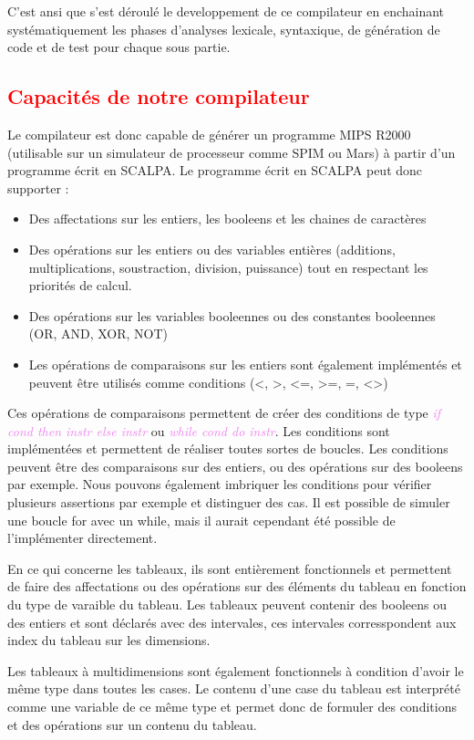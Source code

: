 \documentclass[a4paper]{article}
\let\oldtextit\textit
\renewcommand{\textit}[1]{\textcolor{violet}{\oldtextit{#1}}}
\newcommand{\csection}[1]{\textcolor{red}{\section{#1}}}
\begin{document}
C'est ansi que s'est déroulé le developpement de ce compilateur en enchainant systématiquement les phases d'analyses lexicale, syntaxique, de génération de code et de test pour chaque sous partie.

\csection{Capacités de notre compilateur}

Le compilateur est donc capable de générer un programme MIPS R2000 (utilisable sur un simulateur de processeur comme SPIM ou Mars) à partir d'un programme écrit en SCALPA.
Le programme écrit en SCALPA peut donc supporter :
\begin{itemize}
    \item Des affectations sur les entiers, les booleens et les chaines de caractères
    \item Des opérations sur les entiers ou des variables entières (additions, multiplications, soustraction, division, puissance) tout en respectant les priorités de calcul.
    \item Des opérations sur les variables booleennes ou des constantes booleennes (OR, AND, XOR, NOT)
    \item Les opérations de comparaisons sur les entiers sont également implémentés et peuvent être utilisés comme conditions (<, >, <=, >=, =, <>)
\end{itemize}

Ces opérations de comparaisons permettent de créer des conditions de type \textit{if cond then instr else instr } ou \textit{while cond do instr}. Les conditions sont implémentées et permettent de réaliser toutes sortes de boucles. Les conditions peuvent être des comparaisons sur des entiers, ou des opérations sur des booleens par exemple.
Nous pouvons également imbriquer les conditions pour vérifier plusieurs assertions par exemple et distinguer des cas.
Il est possible de simuler une boucle for avec un while, mais il aurait cependant été possible de l'implémenter directement.

En ce qui concerne les tableaux, ils sont entièrement fonctionnels et permettent de faire des affectations ou des opérations sur des éléments du tableau en fonction du type de varaible du tableau. Les tableaux peuvent contenir des booleens ou des entiers et sont déclarés avec des intervales, ces intervales corresspondent aux index du tableau sur les dimensions.

Les tableaux à multidimensions sont également fonctionnels à condition d'avoir le même type dans toutes les cases. Le contenu d'une case du tableau est interprété comme une variable de ce même type et permet donc de formuler des conditions et des opérations sur un contenu du tableau.
\end{document}
